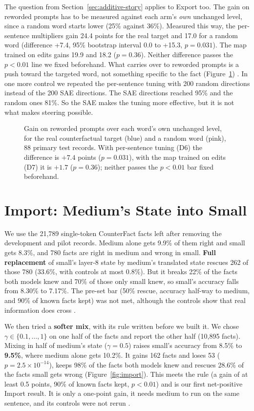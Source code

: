 The question from Section~\ref{sec:additive-story} applies to Export too. The gain on reworded prompts has to be measured against each arm's \emph{own} unchanged level, since a random word starts lower (25\% against 36\%). Measured this way, the per-sentence multipliers gain 24.4 points for the real target and 17.0 for a random word (difference +7.4, 95\% bootstrap interval \cite{r57} 0.0 to +15.3, $p=0.031$). The map trained on edits gains 19.9 and 18.2 ($p=0.36$). Neither difference passes the $p<0.01$ line we fixed beforehand. What carries over to reworded prompts is a push toward the targeted word, not something specific to the fact (Figure~\ref{fig:push}) \cite{p17}. In one more control we repeated the per-sentence tuning with 200 random directions instead of the 200 SAE directions. The SAE directions reached 95\% and the random ones 81\%. So the SAE makes the tuning more effective, but it is not what makes steering possible.

\begin{figure}[!htb]
\centering
{}
\caption{Gain on reworded prompts over each word's own unchanged level, for the real counterfactual target (blue) and a random word (pink), 88 primary test records. With per-sentence tuning (D6) the difference is $+7.4$ points ($p=0.031$), with the map trained on edits (D7) it is $+1.7$ ($p=0.36$); neither passes the $p<0.01$ bar fixed beforehand.}\label{fig:push}
\end{figure}

\section{Import: Medium's State into Small}\label{sec:import}

We use the 21,789 single-token CounterFact facts left after removing the development and pilot records. Medium alone gets 9.9\% of them right and small gets 8.3\%, and 780 facts are right in medium and wrong in small. \textbf{Full replacement} of small's layer-8 state by medium's translated state rescues 262 of those 780 (33.6\%, with controls at most 0.8\%). But it breaks 22\% of the facts both models knew and 70\% of those only small knew, so small's accuracy falls from 8.30\% to 7.17\%. The pre-set bar (50\% rescue, accuracy half-way to medium, and 90\% of known facts kept) was not met, although the controls show that real information does cross \cite{p17}.

We then tried a \textbf{softer mix}, with its rule written before we built it. We chose $\gamma\in\{0.1,\dots,1\}$ on one half of the facts and report the other half (10,895 facts). Mixing in half of medium's state ($\gamma=0.5$) raises small's accuracy from 8.5\% to \textbf{9.5\%}, where medium alone gets 10.2\%. It gains 162 facts and loses 53 ($p=2.5\times10^{-14}$), keeps 98\% of the facts both models knew and rescues 28.6\% of the facts small gets wrong (Figure~\ref{fig:import}). This meets the rule (a gain of at least 0.5 points, 90\% of known facts kept, $p<0.01$) and is our first net-positive Import result. It is only a one-point gain, it needs medium to run on the same sentence, and its controls were not rerun \cite{p17}.

